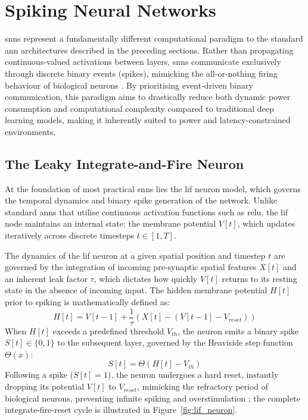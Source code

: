 \section{Spiking Neural Networks}
\label{sec:background_snn}

\glspl{snn} represent a fundamentally different computational paradigm to the standard \gls{ann} architectures described in the preceding sections.
Rather than propagating continuous-valued activations between layers, \glspl{snn} communicate exclusively through discrete binary events (spikes), mimicking the all-or-nothing firing behaviour of biological neurons \cite{Roy2019SpikeBasedMI}.
By prioritising event-driven binary communication, this paradigm aims to drastically reduce both dynamic power consumption and computational complexity compared to traditional deep learning models, making it inherently suited to power and latency-constrained environments.

\subsection{The Leaky Integrate-and-Fire Neuron}
\label{subsec:bg_lif}

At the foundation of most practical \glspl{snn} lies the \acrfull{lif} neuron model, which governs the temporal dynamics and binary spike generation of the network.
Unlike standard \glspl{ann} that utilise continuous activation functions such as \gls{relu}, the \gls{lif} node maintains an internal state: the membrane potential $V[t]$, which updates iteratively across discrete timesteps $t \in [1, T]$.

The dynamics of the \gls{lif} neuron at a given spatial position and timestep $t$ are governed by the integration of incoming pre-synaptic spatial features $X[t]$ and an inherent leak factor $\tau$, which dictates how quickly $V[t]$ returns to its resting state in the absence of incoming input.
The hidden membrane potential $H[t]$ prior to spiking is mathematically defined as:
\begin{equation}
    H[t] = V[t-1] + \frac{1}{\tau} \left(X[t] - (V[t-1] - V_{reset})\right)
    \label{eq:lif_membrane}
\end{equation}
When $H[t]$ exceeds a predefined threshold $V_{th}$, the neuron emits a binary spike $S[t] \in \{0, 1\}$ to the subsequent layer, governed by the Heaviside step function $\Theta(x)$:
\begin{equation}
    S[t] = \Theta(H[t] - V_{th})
    \label{eq:lif_spike}
\end{equation}
Following a spike ($S[t]=1$), the neuron undergoes a hard reset, instantly dropping its potential $V[t]$ to $V_{reset}$, mimicking the refractory period of biological neurons, preventing infinite spiking and overstimulation \cite{sarpeshkar1992refractory}; the complete integrate-fire-reset cycle is illustrated in Figure~\ref{fig:lif_neuron}.

